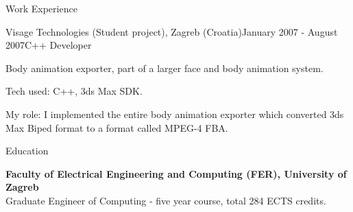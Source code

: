 \documentclass{resume}
\begin{document}
\begin{rSection}{Work Experience}
\begin{rSubsection}{Visage Technologies (Student project), Zagreb (Croatia)}{January 2007 - August 2007}{C++ Developer}{}

Body animation exporter, part of a larger face and body animation system.

\begin{rList}
\item Tech used: C++, 3ds Max SDK.
\item My role: I implemented the entire body animation exporter which converted 3ds Max Biped format to a format called MPEG-4 FBA.
\end{rList}

\end{rSubsection}

\end{rSection}

\begin{rSection}{Education}


{\bf Faculty of Electrical Engineering and Computing (FER), University of Zagreb} \\
Graduate Engineer of Computing - five year course, total 284 ECTS credits.

\end{rSection}
\end{document}
